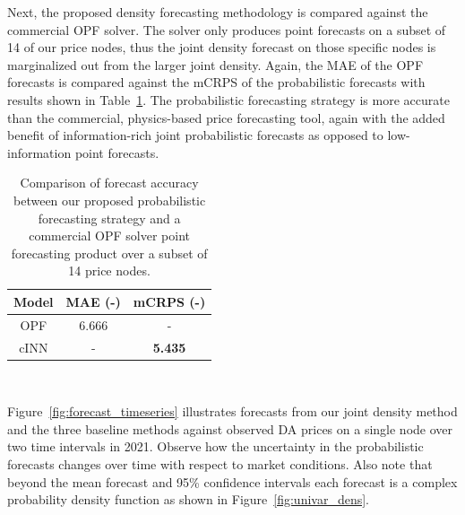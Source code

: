 Next, the proposed density forecasting methodology is compared against the commercial OPF solver.
The solver only produces point forecasts on a subset of 14 of our price nodes, thus the joint
density forecast on those specific nodes is marginalized out from the larger joint density.
Again, the MAE of the OPF forecasts is compared against the mCRPS of the probabilistic forecasts with results shown
in Table~\ref{tab:opf_comp}.
The probabilistic forecasting strategy is more accurate than the commercial, physics-based price
forecasting tool, again with the added benefit of information-rich joint probabilistic forecasts as opposed to
low-information point forecasts.

\begin{table}[htb]
    \caption[Proposed density forecasts v.s. commercial optimal powerflow solver point forecasts]{
        Comparison of forecast accuracy between our proposed probabilistic forecasting strategy and a commercial
        OPF solver point forecasting product over a subset of 14 price nodes.
    }
    \begin{center}
        \begin{tabular}{||c|c|c||} \hline
        Model & MAE (-) & mCRPS (-)  \\	%
        \hline \hline
        OPF  & 6.666 &           -    \\ \hline
        cINN &   -   & \textbf{5.435} \\ \hline
        \end{tabular}
        \\ \rule{0mm}{5mm}
    \end{center}
    \label{tab:opf_comp}
\end{table}

Figure~\ref{fig:forecast_timeseries} illustrates forecasts from our joint density method and the three baseline methods
against observed DA prices on a single node over two time intervals in 2021.
Observe how the uncertainty in the probabilistic forecasts changes over time with respect to market conditions.
Also note that beyond the mean forecast and 95\% confidence intervals each forecast is a complex probability density
function as shown in Figure~\ref{fig:univar_dens}.

